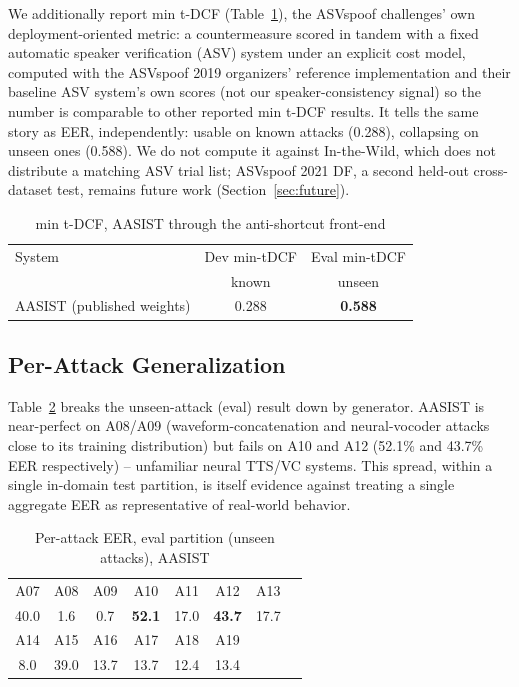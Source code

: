 \documentclass[conference]{IEEEtran}
\begin{document}
We additionally report min t-DCF (Table~\ref{tab:tdcf}), the ASVspoof
challenges' own deployment-oriented metric: a countermeasure scored in
tandem with a fixed automatic speaker verification (ASV) system under
an explicit cost model, computed with the ASVspoof 2019 organizers'
reference implementation and their baseline ASV system's own scores
(not our speaker-consistency signal) so the number is comparable to
other reported min t-DCF results. It tells the same story as EER,
independently: usable on known attacks (0.288), collapsing on unseen
ones (0.588). We do not compute it against In-the-Wild, which does not
distribute a matching ASV trial list; ASVspoof 2021 DF, a second
held-out cross-dataset test, remains future work
(Section~\ref{sec:future}).

\begin{table}[t]
\centering
\caption{min t-DCF, AASIST through the anti-shortcut front-end}
\label{tab:tdcf}
\begin{tabular}{@{}lcc@{}}
\toprule
System & Dev min-tDCF & Eval min-tDCF \\
 & known & unseen \\
\midrule
AASIST (published weights) & 0.288 & \textbf{0.588} \\
\bottomrule
\end{tabular}
\end{table}

\subsection{Per-Attack Generalization}
Table~\ref{tab:perattack} breaks the unseen-attack (eval) result down
by generator. AASIST is near-perfect on A08/A09 (waveform-concatenation
and neural-vocoder attacks close to its training distribution) but
fails on A10 and A12 (52.1\% and 43.7\% EER respectively) -- unfamiliar
neural TTS/VC systems. This spread, within a single in-domain test
partition, is itself evidence against treating a single aggregate EER
as representative of real-world behavior.

\begin{table}[t]
\centering
\caption{Per-attack EER, eval partition (unseen attacks), AASIST}
\label{tab:perattack}
\begin{tabular}{@{}cccccccc@{}}
\toprule
A07 & A08 & A09 & A10 & A11 & A12 & A13 \\
40.0 & 1.6 & 0.7 & \textbf{52.1} & 17.0 & \textbf{43.7} & 17.7 \\
\midrule
A14 & A15 & A16 & A17 & A18 & A19 & \\
8.0 & 39.0 & 13.7 & 13.7 & 12.4 & 13.4 & \\
\bottomrule
\end{tabular}
\end{table}
\end{document}
